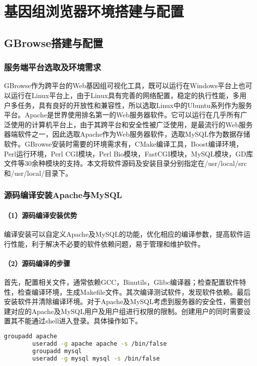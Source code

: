 \chapter{基因组浏览器环境搭建与配置}
	\section{GBrowse搭建与配置}
	
	\subsection{服务端平台选取及环境需求}
	GBrowse作为跨平台的Web基因组可视化工具，既可以运行在Windows平台上也可以运行在Linux平台上，由于Linux具有完善的网络配置，稳定的执行性能，多用户多任务，具有良好的开放性和兼容性，所以选取Linux中的Ubuntu系列作为服务平台。Apache是世界使用排名第一的Web服务器软件。它可以运行在几乎所有广泛使用的计算机平台上，由于其跨平台和安全性被广泛使用，是最流行的Web服务器端软件之一，因此选取Apache作为Web服务器软件，选取MySQL作为数据存储软件。GBrowse安装时需要的环境需求有，CMake编译工具，Boost编译环境，Perl运行环境，Perl CGI模块，Perl Bio模块，FastCGI模块，MySQL模块，GD库文件等30余种模块的支持。本文将软件源码及安装目录分别指定在/usr/local/src和/usr/local/目录下。
	\subsection{源码编译安装Apache与MySQL}
		\subsubsection{（1）源码编译安装优势}
		编译安装可以自定义Apache及MySQL的功能，优化相应的编译参数，提高软件运行性能，利于解决不必要的软件依赖问题，易于管理和维护软件。
		\subsubsection{（2）源码编译的步骤}
		首先，配置相关文件，通常依赖GCC，Binutils，Glibc编译器；检查配置软件特性，检查编译环境，生成Makefile文件。其次编译测试软件，发现软件依赖。最后安装软件并清除编译环境。对于Apache及MySQL考虑到服务器的安全性，需要创建对应的Apache及MySQL用户及用户组进行权限的限制。创建用户的同时需要设置其不能通过shell进入登录。具体操作如下。
		\begin{lstlisting}[language=bash]
		groupadd apache
		useradd -g apache apache -s /bin/false
		groupadd mysql
		useradd -g mysql mysql -s /bin/false
		\end{lstlisting}
